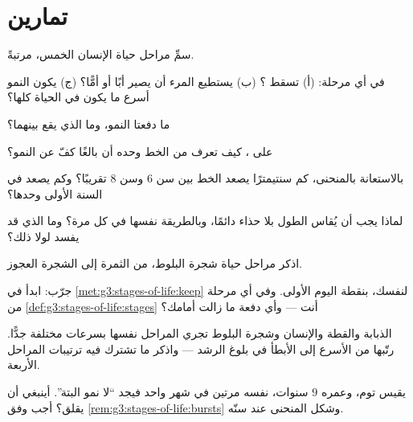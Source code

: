 \section{تمارين}

\begin{exercise}[$\star$]\label{exo:g3:stages-of-life:1}
سمِّ مراحل حياة الإنسان الخمس، مرتبةً.
\end{exercise}

\begin{exercise}[$\star$]\label{exo:g3:stages-of-life:2}
في أي مرحلة: (أ) تسقط ؟ (ب) يستطيع المرء أن يصير
أبًا أو أمًّا؟ (ج) يكون النمو أسرع ما يكون في الحياة كلها؟
\end{exercise}

\begin{exercise}[$\star$]\label{exo:g3:stages-of-life:3}
ما دفعتا النمو، وما الذي يقع بينهما؟
\end{exercise}

\begin{exercise}[$\star$]\label{exo:g3:stages-of-life:4}
على ، كيف تعرف من الخط وحده أن بالغًا كفّ عن النمو؟
\end{exercise}

\begin{exercise}[$\star$]\label{exo:g3:stages-of-life:5}
بالاستعانة بالمنحنى، كم سنتيمترًا يصعد الخط بين سن $6$ وسن $8$
تقريبًا؟ وكم يصعد في السنة الأولى وحدها؟
\end{exercise}

\begin{exercise}[$\star$]\label{exo:g3:stages-of-life:6}
لماذا يجب أن يُقاس الطول بلا حذاء دائمًا، وبالطريقة نفسها في كل
مرة؟ وما الذي قد يفسد لولا ذلك؟
\end{exercise}

\begin{exercise}[$\star$]\label{exo:g3:stages-of-life:7}
اذكر مراحل حياة شجرة البلوط، من الثمرة إلى الشجرة العجوز.
\end{exercise}

\begin{exercise}[$\star$]\label{exo:g3:stages-of-life:8}
جرّب: ابدأ  في \cref{met:g3:stages-of-life:keep} لنفسك،
بنقطة اليوم الأولى. وفي أي مرحلة من
\cref{def:g3:stages-of-life:stages} أنت --- وأي دفعة ما زالت
أمامك؟
\end{exercise}

\begin{exercise}[$\star\star$]\label{exo:g3:stages-of-life:9}
الذبابة والقطة والإنسان وشجرة البلوط تجري المراحل نفسها بسرعات
مختلفة جدًّا. رتّبها من الأسرع إلى الأبطأ في بلوغ الرشد --- واذكر
ما تشترك فيه ترتيبات المراحل الأربعة.
\end{exercise}

\begin{exercise}[$\star\star$]\label{exo:g3:stages-of-life:10}
يقيس توم، وعمره $9$ سنوات، نفسه مرتين في شهر واحد فيجد ``لا نمو
البتة''. أينبغي أن يقلق؟ أجب وفق \cref{rem:g3:stages-of-life:bursts}
وشكل المنحنى عند سنّه.
\end{exercise}
